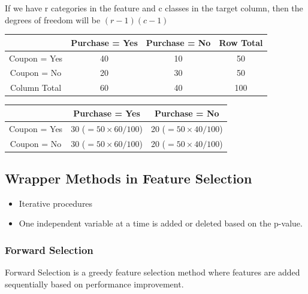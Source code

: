 \documentclass[10pt,a4paper]{article}
\begin{document}
	If we have r categories in the feature and c classes in the target column, then the degrees of freedom will be $(r-1) (c-1)$
	\begin{center}
		\begin{tabular}{|c|c|c|c|}
			\hline
			 & Purchase = Yes & Purchase = No & Row Total \\
			\hline
			Coupon = Yes & 40 & 10 & 50 \\
			\hline
			Coupon = No & 20 & 30 & 50 \\
			\hline
			Column Total & 60 & 40 & 100 \\
			\hline
			\end{tabular}
			
			\vspace{1em}
			
			\begin{tabular}{|c|c|c|}
			\hline
			 & Purchase = Yes & Purchase = No \\
			\hline
			Coupon = Yes & 30 ($=50\times60/100$) & 20 ($=50\times40/100$) \\
			\hline
			Coupon = No & 30 ($=50\times60/100$) & 20 ($=50\times40/100$) \\
			\hline
			\end{tabular}
	\end{center}
	

	\subsection{Wrapper Methods in Feature Selection}

	\begin{itemize}
		\item Iterative procedures
		\item One independent variable at a time is added or deleted based on the p-value.
	\end{itemize}

	\subsubsection{Forward Selection}
	
	Forward Selection is a greedy feature selection method where features are added sequentially based on performance improvement.
	
\end{document}
